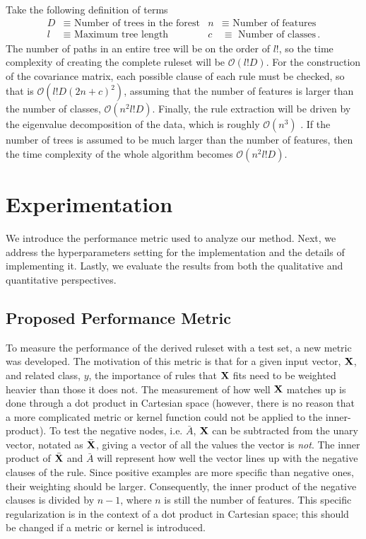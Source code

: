 \documentclass[11pt]{article}
\begin{document}
Take the following definition of terms
\begin{align*}
D & \equiv \text{ Number of trees in the forest} & n & \equiv \text{ Number of features} \\
l &\equiv \text{ Maximum tree length} & c &\equiv \text{ Number of classes} \, .
\end{align*}
The number of paths in an entire tree will be on the order of $l!$, so the time complexity of creating the complete ruleset will be $\mathcal{O}(l! D)$. For the construction of the covariance matrix, each possible clause of each rule must be checked, so that is $\mathcal{O}(l!D(2n+c)^2)$, assuming that the number of features is larger than the number of classes, $\mathcal{O}(n^2l!D)$. Finally, the rule extraction will be driven by the eigenvalue decomposition of the data, which is roughly $\mathcal{O}(n^{3})$ \citep{strang2006linear}. If the number of trees is assumed to be much larger than the number of features, then the time complexity of the whole algorithm becomes $\mathcal{O}(n^2 l! D)$.
 
 
\section{Experimentation}
\label{sec:experiment}
We introduce the performance metric used to analyze our method. Next, we address the hyperparameters setting for the implementation and the details of implementing it. Lastly, we evaluate the results from both the qualitative and quantitative perspectives. 
\subsection{Proposed Performance Metric}
To measure the performance of the derived ruleset with a test set, a new metric was developed. The motivation of this metric is that for a given input vector, $\vb{X}$, and related class, $y$, the importance of rules that $\vb{X}$ fits need to be weighted heavier than those it does not. The measurement of how well $\vb{X}$ matches up is done through a dot product in Cartesian space (however, there is no reason that a more complicated metric or kernel function could not be applied to the inner-product). To test the negative nodes, i.e. $\bar{A}$, $\vb{X}$ can be subtracted from the unary vector, notated as $\bar{\vb{X}}$, giving a vector of all the values the vector is \textit{not}. The inner product of $\bar{\vb{X}}$ and $\bar{A}$ will represent how well the vector lines up with the negative clauses of the rule. Since positive examples are more specific than negative ones, their weighting should be larger. Consequently, the inner product of the negative clauses is divided by $n-1$, where $n$ is still the number of features. This specific regularization is in the context of a dot product in Cartesian space; this should be changed if a metric or kernel is introduced. 
\end{document}
